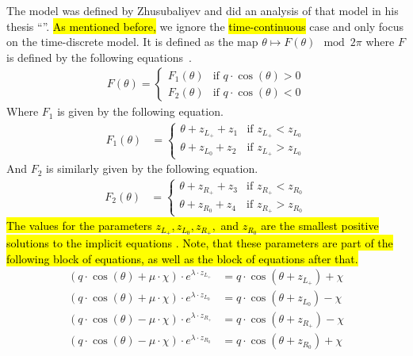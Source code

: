 The model was defined by Zhusubaliyev and  did an analysis of that model in his thesis ``''.
\hl{As mentioned before,} we ignore the \hl{time-continuous} case and only focus on the time-discrete model.
It is defined as the map $\theta \mapsto F(\theta) \mod 2 \pi$ where $F$ is defined by the following equations~\cite{akyuz2022}.
\begin{align}
	F(\theta) = \begin{cases}
		            F_1(\theta) & \text{if } q \cdot \cos(\theta) > 0 \\
		            F_2(\theta) & \text{if } q \cdot \cos(\theta) < 0
	            \end{cases}
\end{align}
Where $F_1$ is given by the following equation.
\begin{align}
	F_1(\theta) & = \begin{cases}
		                \theta + z_{L_+} + z_1 & \text{if } z_{L_+} < z_{L_0} \\
		                \theta + z_{L_0} + z_2 & \text{if } z_{L_+} > z_{L_0}
	                \end{cases}
\end{align}
And $F_2$ is similarly given by the following equation.
\begin{align}
	F_2(\theta) & = \begin{cases}
		                \theta + z_{R_+} + z_3 & \text{if } z_{R_+} < z_{R_0} \\
		                \theta + z_{R_0} + z_4 & \text{if } z_{R_+} > z_{R_0}
	                \end{cases}
\end{align}
\hl{
	The values for the parameters $z_{L_+}, z_{L_0}, z_{R_+},$ and $z_{R_0}$ are the smallest positive solutions to the implicit equations .
	Note, that these parameters are part of the following block of equations, as well as the block of equations after that.
}
\begin{subequations}
	\begin{align}
		(q \cdot \cos(\theta) + \mu \cdot \chi) \cdot e^{\lambda \cdot z_{L_+}}
		 & = q \cdot \cos(\theta + z_{L_+}) + \chi \label{equ:setup.og.def.impl.1.A} \\
		(q \cdot \cos(\theta) + \mu \cdot \chi) \cdot e^{\lambda \cdot z_{L_0}}
		 & = q \cdot \cos(\theta + z_{L_0}) - \chi                                   \\
		(q \cdot \cos(\theta) - \mu \cdot \chi) \cdot e^{\lambda \cdot z_{R_+}}
		 & = q \cdot \cos(\theta + z_{R_+}) - \chi                                   \\
		(q \cdot \cos(\theta) - \mu \cdot \chi) \cdot e^{\lambda \cdot z_{R_0}}
		 & = q \cdot \cos(\theta + z_{R_0}) + \chi \label{equ:setup.og.def.impl.1.D}
	\end{align}
\end{subequations}
